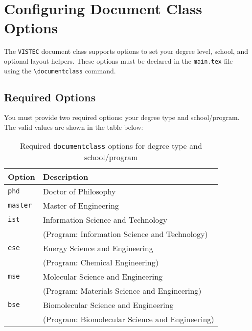 \documentclass{VISTEC}
\begin{document}
\section{Configuring Document Class Options}
\label{manual:class-options}

\begin{paragraph}
The \texttt{VISTEC} document class supports options to set your degree level, school, and optional layout helpers. These options must be declared in the \texttt{main.tex} file using the \verb|\documentclass| command.
\end{paragraph}

\subsection{Required Options}
\label{manual:class-required}

\begin{subparagraph}
You must provide two required options: your degree type and school/program. The valid values are shown in the table below:
\end{subparagraph}

\begin{table}[ht]
\centering
\caption{Required \texttt{documentclass} options for degree type and school/program}
\small\singlespacingplus
\begin{tabular}{ll}
\toprule
\textbf{Option} & \textbf{Description} \\
\midrule
\texttt{phd}    & Doctor of Philosophy \\
\texttt{master} & Master of Engineering \\
\midrule
\texttt{ist}    & Information Science and Technology \\
               & (Program: Information Science and Technology) \\
\texttt{ese}    & Energy Science and Engineering \\
               & (Program: Chemical Engineering) \\
\texttt{mse}    & Molecular Science and Engineering \\
               & (Program: Materials Science and Engineering) \\
\texttt{bse}    & Biomolecular Science and Engineering \\
               & (Program: Biomolecular Science and Engineering) \\
\bottomrule
\end{tabular}
\end{table}
\end{document}
